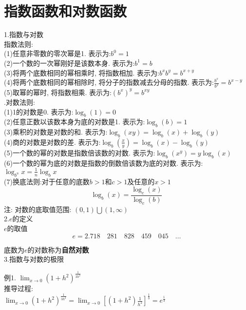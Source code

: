 \chapter{指数函数和对数函数}
1.指数与对数\\
指数法则:\\
(1)任意非零数的零次幂是1. 表示为:\quad$b^0=1$\\
(2)一个数的一次幂刚好是该数本身. 表示为:\quad$b^1=b$\\
(3)将两个底数相同的幂相乘时, 将指数相加. 表示为:\quad$b^xb^y=b^{x+y}$\\
(4)将两个底数相同的幂相除时, 将分子的指数减去分母的指数. 表示为:\quad$\displaystyle\frac{b^x}{b^y}=b^{x-y}$\\
(5)取幂的幂时, 将指数相乘. 表示为:\quad$(b^x)^y=b^{xy}$\\

.对数法则:\\
(1)1的对数是0. 表示为:\quad$\log_b(1)=0$\\
(2)任意正数以该数本身为底的对数是1. 表示为:\quad$\log_b(b)=1$\\
(3)乘积的对数是对数的和. 表示为:\quad$\log_b(xy)=\log_b(x)+\log_b(y)$\\
(4)商的对数是对数的差. 表示为:\quad$\displaystyle\log_b(\frac{x}{y})=\log_b(x)-\log_b(y)$\\
(5)一个数的幂的对数是指数倍该数的对数. 表示为:\quad$\log_b(x^y)=y\log_b(x)$\\
(6)一个数的幂为底的对数是指数的倒数倍该数为底的对数. 表示为:\quad$\displaystyle\log_{b^n}x=\frac{1}{n}\log_bx$\\
(7)\quad 换底法则:对于任意的底数$b>1$和$c>1$及任意的$x>1$
\[\log_b(x)=\frac{\log_c(x)}{\log_c(b)}\]
注: 对数的底取值范围: $(0,1)\bigcup(1,\infty)$\\[2ex]

2.$e$的定义\\
$e$的取值\\
\[e=2.718\quad281\quad828\quad459\quad045\quad\ldots\]

底数为$e$的对数称为\textbf{自然对数}\\[2ex]

3.指数与对数的极限\\
\begin{center}
\end{center}
\begin{center}
\end{center}
例1.
\phantom{例}$\displaystyle\lim_{x\to 0}(1+h^2)^{\frac{1}{3h^2}}$\\
推导过程:\\
$\displaystyle\lim_{x\to 0}(1+h^2)^{\frac{1}{3h^2}}=\lim_{x\to 0}[(1+h^2)\frac{1}{h^2}]^{\frac{1}{3}}=e^{\frac{1}{3}}$\\

